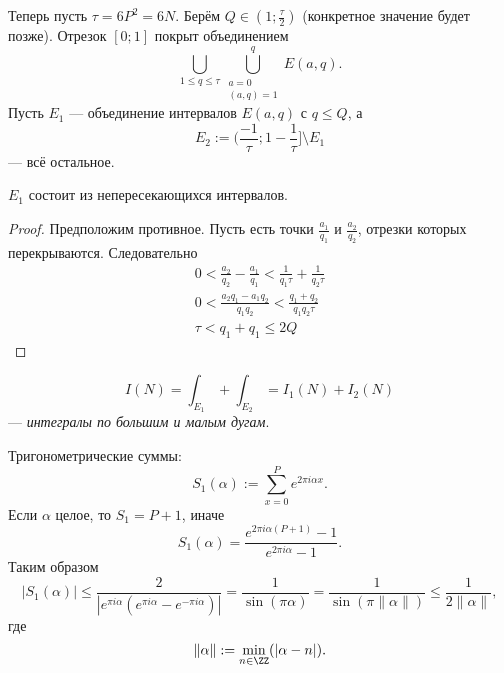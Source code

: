 \documentclass[12pt,a4paper]{article}
\begin{document}
    Теперь пусть $\tau = 6 P^2 = 6N$. Берём $Q \in (1; \frac{\tau}{2})$ (конкретное значение будет позже). Отрезок $[0; 1]$ покрыт объединением
    \[\bigcup_{1 \leqslant q \leqslant \tau} \bigcup_{\substack{a = 0\\ (a, q) = 1}}^q E(a, q).\]
    Пусть $E_1$ --- объединение интервалов $E(a, q)$ с $q \leqslant Q$, а
    \[E_2 := (\frac{-1}{\tau}; 1 - \frac{1}{\tau}] \setminus E_1\]
    --- всё остальное.

    \begin{theorem}
        $E_1$ состоит из непересекающихся интервалов.
    \end{theorem}

    \begin{proof}
        Предположим противное. Пусть есть точки $\frac{a_1}{q_1}$ и $\frac{a_2}{q_2}$, отрезки которых перекрываются. Следовательно
        \begin{gather*}
            0 < \frac{a_2}{q_2} - \frac{a_1}{q_1} < \frac{1}{q_1 \tau} + \frac{1}{q_2 \tau}\\
            0 < \frac{a_2 q_1 - a_1 q_2}{q_1 q_2} < \frac{q_1 + q_2}{q_1 q_2 \tau}\\
            \tau < q_1 + q_1 \leqslant 2Q
        \end{gather*}
    \end{proof}

    \[I(N) = \int_{E_1} + \int_{E_2} = I_1(N) + I_2(N)\]
    --- \emph{интегралы по большим и малым дугам}.

    Тригонометрические суммы:
    \[S_1(\alpha) := \sum_{x=0}^P e^{2 \pi i \alpha x}.\]
    Если $\alpha$ целое, то $S_1 = P+1$, иначе
    \[S_1(\alpha) = \frac{e^{2 \pi i \alpha (P+1)} - 1}{e^{2 \pi i \alpha} - 1}.\]
    Таким образом
    \[|S_1(\alpha)| \leqslant \frac{2}{|e^{\pi i \alpha}(e^{\pi i \alpha} - e^{-\pi i \alpha})|} = \frac{1}{\sin(\pi \alpha)} = \frac{1}{\sin(\pi \|\alpha\|)} \leqslant \frac{1}{2 \|\alpha\|},\]
    где
    \[\|\alpha\| := \min_{n \in \ZZ}(|\alpha - n|).\]
\end{document}
